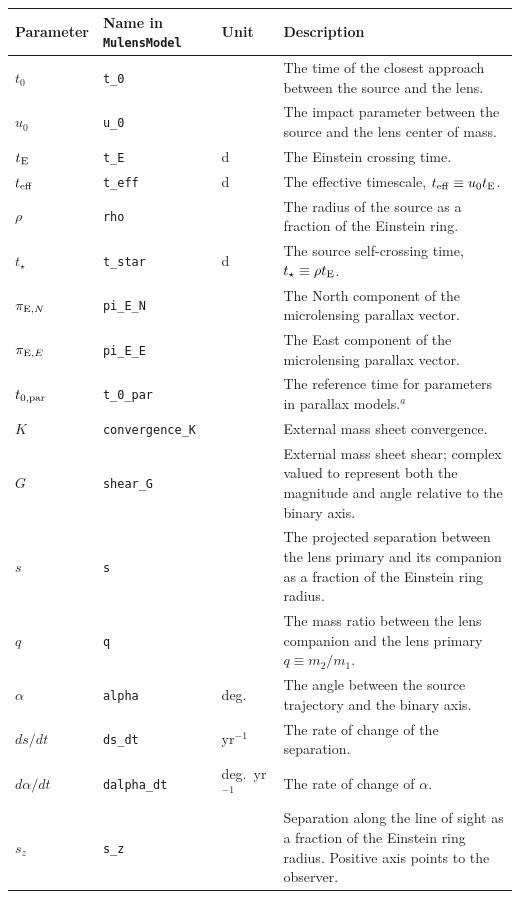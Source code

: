 \documentclass[12pt]{article}
\newcommand\MM{{\tt MulensModel}}
\begin{document}
\begin{landscape}
\captionsetup{width=20cm}
\begin{longtable}{l l l p{12cm}}
Parameter & Name in \MM &  Unit & Description \\
\hline
$t_0$ & {\tt t\_0} & & The time of the closest approach between the source and the lens. \\
$u_0$ & {\tt u\_0} & & The impact parameter between the source and the lens center of mass. \\
$t_{\rm E}$ & {\tt t\_E} & d & The Einstein crossing time. \\
$t_{\rm eff}$ & {\tt t\_eff} & d & The effective timescale, $t_{\rm eff} \equiv u_0 t_{\rm E}$. \\
$\rho$ & {\tt rho} & & The radius of the source as a fraction of the Einstein ring. \\
$t_{\star}$ & {\tt t\_star} & d & The source self-crossing time, $t_\star \equiv \rho t_{\rm E}$. \\
$\pi_{{\rm E}, N}$ & {\tt pi\_E\_N} & & The North component of the microlensing parallax vector. \\
$\pi_{{\rm E}, E}$ & {\tt pi\_E\_E} & & The East component of the microlensing parallax vector. \\
$t_{0,{\rm par}}$ & {\tt t\_0\_par} & & The reference time for parameters in parallax models.$^a$ \\
$K$ & {\tt convergence\_K} & & External mass sheet convergence. \\
$G$ & {\tt shear\_G} & & External mass sheet shear; complex valued to represent both the magnitude and angle relative to the binary axis. \\
$s$ & {\tt s} & & The projected separation between the lens primary and its companion as a fraction of the Einstein ring radius. \\
$q$ & {\tt q} & & The mass ratio between the lens companion and the lens primary $q \equiv m_2/m_1$. \\
$\alpha$ & {\tt alpha} & deg. & The angle between the source trajectory and the binary axis. \\
$ds/dt$ & {\tt ds\_dt} & yr$^{-1}$ & The rate of change of the separation. \\
$d\alpha/dt$ & {\tt dalpha\_dt} & deg.~yr$^{-1}$ & The rate of change of $\alpha$. \\
$s_{z}$ & {\tt s\_z} & & Separation along the line of sight as a fraction of the Einstein ring radius. Positive axis points to the observer. \\

\end{longtable}
\end{landscape}
\end{document}
